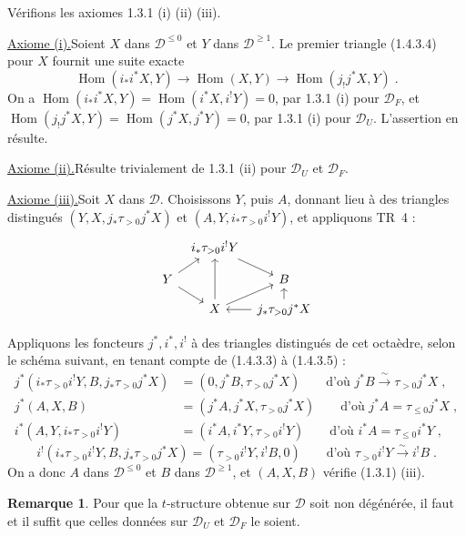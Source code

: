 \documentclass[12pt,a4paper]{article}
\theoremstyle{plain}
\theoremstyle{definition}
\newtheorem{remark}[theorem]{Remarque}
\DeclareMathOperator{\Hom}{Hom}
\begin{document}
V\'erifions les axiomes 1.3.1 (i) (ii) (iii).

\smallskip
\noindent\underline{Axiome (i).}\quad Soient $X$ dans $\mathcal{D}^{\leqslant 0}$ et $Y$ dans $\mathcal{D}^{\geqslant 1}$. Le premier triangle (1.4.3.4) pour $X$ fournit une suite exacte
\[
\Hom(i_*i^*X, Y) \to \Hom(X,Y) \to \Hom(j_!j^*X, Y)\;.
\]
On a $\Hom(i_*i^*X, Y) = \Hom(i^*X, i^!Y) = 0$, par 1.3.1 (i) pour $\mathcal{D}_F$, et $\Hom(j_!j^*X, Y) = \Hom(j^*X, j^*Y) = 0$, par 1.3.1 (i) pour $\mathcal{D}_U$. L'assertion en r\'esulte.

\smallskip
\noindent\underline{Axiome (ii).}\quad R\'esulte trivialement de 1.3.1 (ii) pour $\mathcal{D}_U$ et $\mathcal{D}_F$.

\smallskip
\noindent\underline{Axiome (iii).}\quad Soit $X$ dans $\mathcal{D}$. Choisissons $Y$, puis $A$, donnant lieu \`a des triangles distingu\'es $(Y, X, j_*\tau_{>0}j^*X)$ et $(A, Y, i_*\tau_{>0}i^!Y)$, et appliquons TR~4 :
\[
\begin{tikzcd}[column sep=tiny, row sep=small]
& i_*\tau_{>0}i^!Y \arrow[dr] \\
Y \arrow[ur] \arrow[dr] && B \arrow[dl] \\
& X \arrow[uu, crossing over] \arrow[ur, crossing over] & j_*\tau_{>0}j^*X \arrow[l] \arrow[u]
\end{tikzcd}
\]

Appliquons les foncteurs $j^*, i^*, i^!$ \`a des triangles distingu\'es de cet octa\`edre, selon le sch\'ema suivant, en tenant compte de (1.4.3.3) \`a (1.4.3.5) :
\begin{align*}
j^*(i_*\tau_{>0}i^!Y, B, j_*\tau_{>0}j^*X) &= (0, j^*B, \tau_{>0}j^*X) \qquad\text{d'o\`u } j^*B \xrightarrow{\;\sim\;} \tau_{>0}j^*X\;,\\
j^*(A, X, B) &= (j^*A, j^*X, \tau_{>0}j^*X) \qquad\text{d'o\`u } j^*A = \tau_{\leqslant 0}j^*X\;,\\
i^*(A, Y, i_*\tau_{>0}i^!Y) &= (i^*A, i^*Y, \tau_{>0}i^!Y) \qquad\text{d'o\`u } i^*A = \tau_{\leqslant 0}i^*Y\;,
\end{align*}
\[
i^!(i_*\tau_{>0}i^!Y, B, j_*\tau_{>0}j^*X) = (\tau_{>0}i^!Y, i^!B, 0) \qquad\text{d'o\`u } \tau_{>0}i^!Y \xrightarrow{\;\sim\;} i^!B\;.
\]
On a donc $A$ dans $\mathcal{D}^{\leqslant 0}$ et $B$ dans $\mathcal{D}^{\geqslant 1}$, et $(A, X, B)$ v\'erifie (1.3.1) (iii).

\begin{remark}\label{rem:1.4.11}
Pour que la $t$-structure obtenue sur $\mathcal{D}$ soit non d\'eg\'en\'er\'ee, il faut et il suffit que celles donn\'ees sur $\mathcal{D}_U$ et $\mathcal{D}_F$ le soient.
\end{remark}
\end{document}

